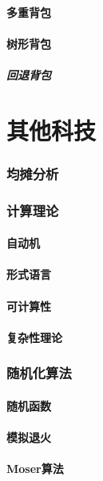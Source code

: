 \documentclass[12pt,a4paper]{article}
\begin{document}
\subsection{多重背包}
\subsection{树形背包}
\subsubsection{回退背包}
\newpage
\part{其他科技}
\section{均摊分析}

\newpage
\section{计算理论}  %
\subsection{自动机}
\subsection{形式语言}
\subsection{可计算性}
\subsection{复杂性理论}

\newpage
\section{随机化算法}
\subsection{随机函数}
\subsection{模拟退火} %
\subsection{Moser算法}
\end{document}
